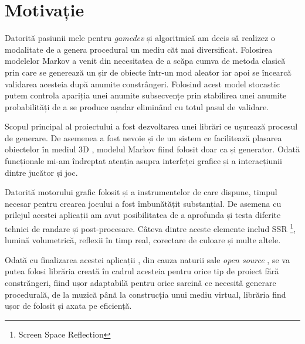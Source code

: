 \chapter*{Motivație} 

Datorită pasiunii mele pentru \textit{gamedev} și algoritmică am decis să realizez o modalitate de a genera procedural un mediu căt mai diversificat. Folosirea modelelor Markov a venit din necesitatea de a scăpa cumva de metoda clasică prin care se generează un șir de obiecte într-un mod aleator iar apoi se încearcă validarea acesteia după anumite constrângeri. Folosind acest model stocastic putem controla apariția unei anumite subsecvențe prin stabilirea unei anumite probabilități de a se produce așadar eliminând cu totul pasul de validare.\par

Scopul principal al proiectului a fost dezvoltarea unei librări ce ușurează procesul de generare. De asemenea a fost nevoie și de un sistem ce facilitează plasarea obiectelor în mediul 3D , modelul Markov fiind folosit doar ca și generator. Odată  funcționale mi-am îndreptat atenția asupra interfeței grafice și a interacțiunii dintre jucător și joc.\par

Datorită motorului grafic folosit și a instrumentelor de care dispune, timpul necesar pentru crearea jocului a fost îmbunătățit substanțial. De asemena cu prilejul acestei aplicații am avut posibilitatea de a aprofunda și testa diferite tehnici de randare și post-procesare. Câteva dintre aceste elemente includ SSR \footnote{Screen Space Reflection}, lumină volumetrică, reflexii în timp real, corectare de culoare și multe altele.\par

Odată cu finalizarea acestei aplicații , din cauza naturii sale \textit{open source} , se va putea folosi librăria creată în cadrul acesteia pentru orice tip de proiect fără constrăngeri, fiind ușor adaptabilă pentru orice sarcină ce necesită generare procedurală, de la muzică până la construcția unui mediu virtual, librăria find ușor de folosit și axata pe eficiență.\par

